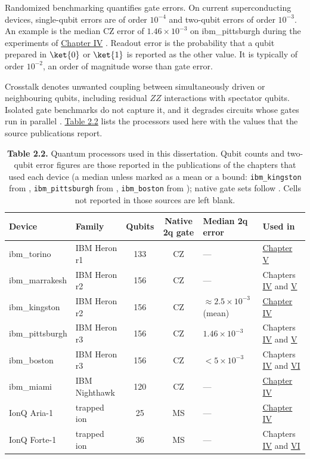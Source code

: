 \documentclass{report}
\theoremstyle{plain}
\theoremstyle{definition}
\theoremstyle{remark}
\begin{document}
Randomized benchmarking \cite{magesan2012rb} quantifies gate errors. On current superconducting devices, single-qubit errors are of order $10^{-4}$ and two-qubit errors of order $10^{-3}$. An example is the median CZ error of $1.46\times 10^{-3}$ on ibm\_pittsburgh during the experiments of \hyperref[ch:qml]{Chapter IV} \cite{guo2025shardq}. Readout error is the probability that a qubit prepared in $\ket{0}$ or $\ket{1}$ is reported as the other value. It is typically of order $10^{-2}$, an order of magnitude worse than gate error.

Crosstalk denotes unwanted coupling between simultaneously driven or neighbouring qubits, including residual $ZZ$ interactions with spectator qubits. Isolated gate benchmarks do not capture it, and it degrades circuits whose gates run in parallel \cite{sheldon2016echoedcr}. \hyperref[tab:bg:devices]{Table 2.2} lists the processors used here with the values that the source publications report.

\begin{table}[htbp]
\caption{\textbf{Table 2.2.} Quantum processors used in this dissertation. Qubit counts and two-qubit error figures are those reported in the publications of the chapters that used each device (a median unless marked as a mean or a bound: \texttt{ibm\_kingston} from \cite{guo2025vqt}, \texttt{ibm\_pittsburgh} from \cite{guo2025shardq}, \texttt{ibm\_boston} from \cite{guo2026nnqa}); native gate sets follow \cite{guo2026rubriq}. Cells not reported in those sources are left blank.}
\label{tab:bg:devices}
 \footnotesize
\begin{tabular}{llccll}
\toprule
Device & Family & Qubits & Native 2q gate & Median 2q error & Used in \\
\midrule
ibm\_torino & IBM Heron r1 & 133 & CZ & --- & \hyperref[ch:nisq]{Chapter V} \\
ibm\_marrakesh & IBM Heron r2 & 156 & CZ & --- & Chapters \hyperref[ch:qml]{IV} and \hyperref[ch:nisq]{V} \\
ibm\_kingston & IBM Heron r2 & 156 & CZ & $\approx2.5\times 10^{-3}$ (mean) & \hyperref[ch:qml]{Chapter IV} \\
ibm\_pittsburgh & IBM Heron r3 & 156 & CZ & $1.46\times 10^{-3}$ & Chapters \hyperref[ch:qml]{IV} and \hyperref[ch:nisq]{V} \\
ibm\_boston & IBM Heron r3 & 156 & CZ & $<5\times 10^{-3}$ & Chapters \hyperref[ch:qml]{IV} and \hyperref[ch:synthesis]{VI} \\
ibm\_miami & IBM Nighthawk & 120 & CZ & --- & \hyperref[ch:qml]{Chapter IV} \\
IonQ Aria-1 & trapped ion & 25 & MS & --- & \hyperref[ch:qml]{Chapter IV} \\
IonQ Forte-1 & trapped ion & 36 & MS & --- & Chapters \hyperref[ch:qml]{IV} and \hyperref[ch:synthesis]{VI} \\
\bottomrule
\end{tabular}
\end{table}
\end{document}
